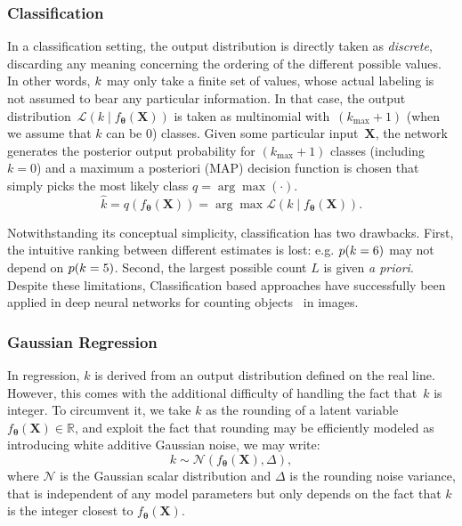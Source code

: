 \subsubsection{Classification}
In a classification setting, the output distribution is directly taken as \textit{discrete}, discarding any meaning concerning the ordering of the different possible values.
In other words, \(k \) may only take a finite set of values, whose actual labeling is not assumed to bear any particular information.
In that case, the output distribution~$\mathcal{L}\left(k\mid f_\mathbf{\theta}\left(\mathbf{X}\right)\right)$ is taken as multinomial with~\((k_{\max} + 1)\) (when we assume that \(k\) can be 0) classes.
Given some particular input~$\mathbf{X}$, the network generates the posterior output probability for \((k_{\max} + 1)\) classes (including \(k=0\)) and a maximum a posteriori (MAP) decision function is chosen that simply picks the most likely class \(q = \arg\max(\cdot)\).
\begin{equation}
\hat{k}=q\left(f_{\mathbf{\theta}}\left(\mathbf{X}\right)\right)=\arg\max\mathcal{L}(k\mid f_{\mathbf{\theta}}\left(\mathbf{X}\right)).
\end{equation}

Notwithstanding its conceptual simplicity, classification has two drawbacks.
First, the intuitive ranking between different estimates is lost: e.g. \(p(k = 6) \) may not depend on \(p(k = 5) \).
Second, the largest possible count $L$ is given \textit{a priori}.
Despite these limitations,
Classification based approaches have successfully been applied in deep neural networks for counting objects~\cite{segui15, zhang2015salient, khan16} in images.

\subsubsection{Gaussian Regression}
In regression, $k$ is derived from an output distribution defined on the real line.
However, this comes with the additional difficulty of handling the fact that~$k$ is integer.
To circumvent it, we take $k$ as the rounding of a latent variable $f_{\mathbf{\theta}}\left(\mathbf{X}\right)\in\mathbb{R}$, and exploit the fact that rounding may be efficiently modeled as introducing white additive Gaussian noise, we may write:
\begin{equation}
k\sim\mathcal{N}\left(f_{\mathbf{\mathbf{\theta}}}\left(\mathbf{X}\right),\Delta\right),\label{eq:AWGN_model}
\end{equation}
where $\mathcal{N}$ is the Gaussian scalar distribution and $\Delta$ is the rounding noise variance, that is independent of any model parameters but only depends on the fact that $k$ is the integer closest to $f_{\mathbf{\mathbf{\theta}}}\left(\mathbf{X}\right)$.


